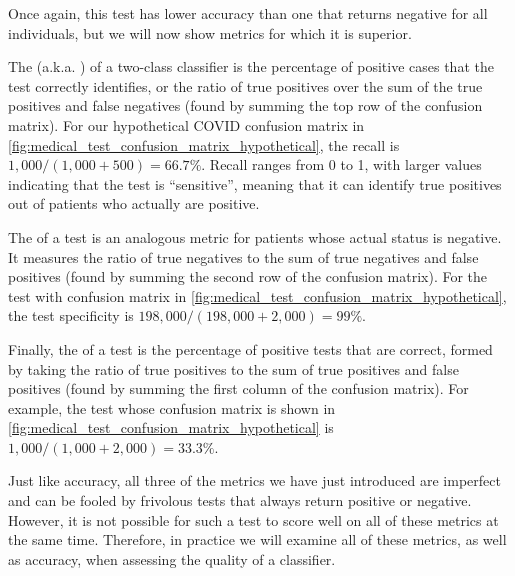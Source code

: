 \begin{qbox}\end{qbox}

Once again, this test has lower accuracy than one that returns negative for all individuals, but we will now show metrics for which it is superior.

The  (a.k.a. ) of a two-class classifier is the percentage of positive cases that the test correctly identifies, or the ratio of true positives over the sum of the true positives and false negatives (found by summing the top row of the confusion matrix). For our hypothetical COVID confusion matrix in \autoref{fig:medical_test_confusion_matrix_hypothetical}, the recall is $1,000/(1,000 + 500) = 66.7\%$. Recall ranges from 0 to 1, with larger values indicating that the test is ``sensitive'', meaning that it can identify true positives out of patients who actually are positive.

The  of a test is an analogous metric for patients whose actual status is negative. It measures the ratio of true negatives to the sum of true negatives and false positives (found by summing the second row of the confusion matrix). For the test with confusion matrix in \autoref{fig:medical_test_confusion_matrix_hypothetical}, the test specificity is $198,000/(198,000 + 2,000) = 99\%$.

Finally, the  of a test is the percentage of positive tests that are correct, formed by taking the ratio of true positives to the sum of true positives and false positives (found by summing the first column of the confusion matrix). For example, the  test whose confusion matrix is shown in \autoref{fig:medical_test_confusion_matrix_hypothetical} is $1,000/(1,000 + 2,000) = 33.3\%$.

\begin{qbox}\end{qbox}

Just like accuracy, all three of the metrics we have just introduced are imperfect and can be fooled by frivolous tests that always return positive or negative. However, it is not possible for such a test to score well on all of these metrics at the same time. Therefore, in practice we will examine all of these metrics, as well as accuracy, when assessing the quality of a classifier.

